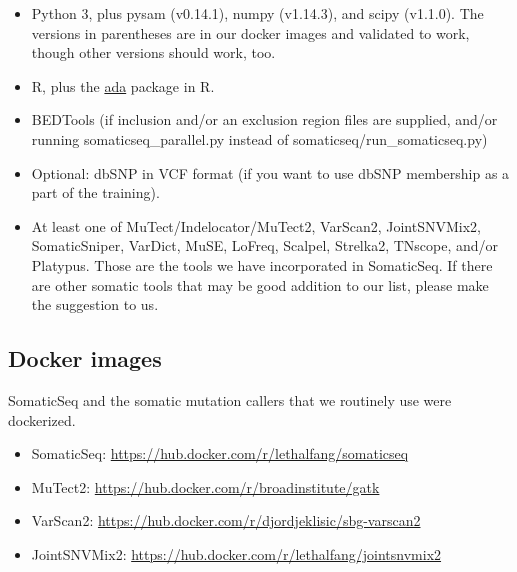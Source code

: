 \documentclass[10pt,letterpaper]{article}
\begin{document}
\begin{sloppypar}
\begin{itemize}

\item
Python 3, plus pysam (v0.14.1), numpy (v1.14.3), and scipy (v1.1.0). The versions in parentheses are in our docker images and validated to work, though other versions should work, too.

\item
R, plus the \href{https://cran.r-project.org/package=ada}{ada} package in R.

\item
BEDTools (if inclusion and/or an exclusion region files are supplied, and/or running somaticseq\_parallel.py instead of somaticseq/run\_somaticseq.py)

\item
Optional: dbSNP in VCF format (if you want to use dbSNP membership as a part of the training).

\item
At least one of MuTect/Indelocator/MuTect2, VarScan2, JointSNVMix2, SomaticSniper, VarDict, MuSE, LoFreq, Scalpel, Strelka2, TNscope, and/or Platypus. Those are the tools we have incorporated in SomaticSeq. If there are other somatic tools that may be good addition to our list, please make the suggestion to us. 

\end{itemize}


\subsection{Docker images}

SomaticSeq and the somatic mutation callers that we routinely use were dockerized. 

\begin{itemize}

  \item SomaticSeq:    \href{https://hub.docker.com/r/lethalfang/somaticseq}{https://hub.docker.com/r/lethalfang/somaticseq}
  
  \item MuTect2:       \href{https://hub.docker.com/r/broadinstitute/gatk}{https://hub.docker.com/r/broadinstitute/gatk}

  \item VarScan2:      \href{https://hub.docker.com/r/djordjeklisic/sbg-varscan2}{https://hub.docker.com/r/djordjeklisic/sbg-varscan2}

  \item JointSNVMix2:  \href{https://hub.docker.com/r/lethalfang/jointsnvmix2}{https://hub.docker.com/r/lethalfang/jointsnvmix2}


\end{itemize}
\end{sloppypar}
\end{document}
